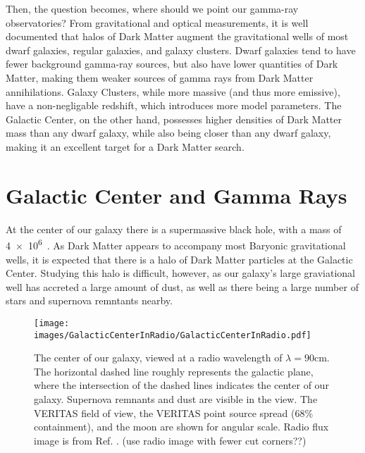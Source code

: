   Then, the question becomes, where should we point our gamma-ray observatories?
  From gravitational and optical measurements, it is well documented that halos of Dark Matter augment the gravitational wells of most dwarf galaxies, regular galaxies, and galaxy clusters.
  Dwarf galaxies tend to have fewer background gamma-ray sources, but also have lower quantities of Dark Matter, making them weaker sources of gamma rays from Dark Matter annihilations.
  Galaxy Clusters, while more massive (and thus more emissive), have a non-negligable redshift, which introduces more model parameters.
  The Galactic Center, on the other hand, possesses higher densities of Dark Matter mass than any dwarf galaxy, while also being closer than any dwarf galaxy, making it an excellent target for a Dark Matter search.


\section{Galactic Center and Gamma Rays}

  At the center of our galaxy there is a supermassive black hole, with a mass of \SI{4e6}{\Msol{}}~\cite{sgra_massdist}.
  As Dark Matter appears to accompany most Baryonic gravitational wells, it is expected that there is a halo of Dark Matter particles at the Galactic Center.
  Studying this halo is difficult, however, as our galaxy's large graviational well has accreted a large amount of dust, as well as there being a large number of stars and supernova remntants nearby.

  \begin{figure}[ht]
    \centering
    \texttt{[image: images/GalacticCenterInRadio/GalacticCenterInRadio.pdf]}
    \caption[Galactic Center in Radio]{
      The center of our galaxy, viewed at a radio wavelength of $\lambda=90\text{cm}$.
      The horizontal dashed line roughly represents the galactic plane, where the intersection of the dashed lines indicates the center of our galaxy.
      Supernova remnants and dust are visible in the view.
      The VERITAS field of view, the VERITAS point source spread (68\% containment), and the moon are shown for angular scale.
      Radio flux image is from Ref. \cite{galactic_center_in_radio}.
      {\color{red}(use radio image with fewer cut corners??)}
      \CaptionBlankLine
    }
    \label{fig_gc_radio}
  \end{figure}

